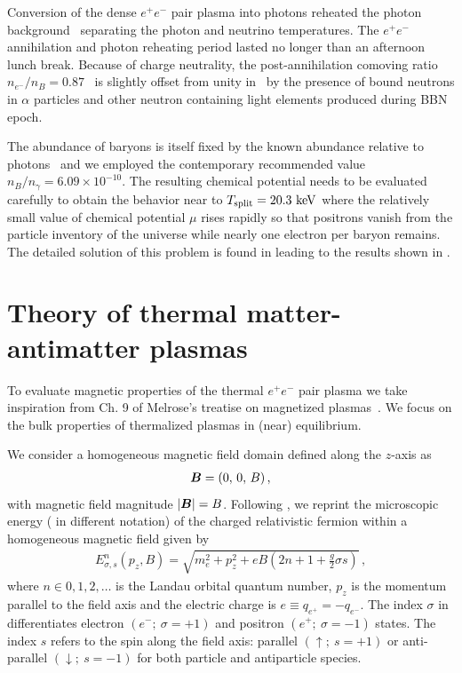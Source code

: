 Conversion of the dense $e^{+}e^{-}$ pair plasma into photons reheated the photon background~\citep{Birrell:2014uka} separating the photon and neutrino temperatures. The $e^{+}e^{-}$ annihilation and photon reheating period lasted no longer than an afternoon lunch break. Because of charge neutrality, the post-annihilation comoving ratio $n_{e^{-}}/n_{B}=0.87$~\citep{Rafelski:2023emw} is slightly offset from unity in~ by the presence of bound neutrons in $\alpha$ particles and other neutron containing light elements produced during BBN epoch.

The abundance of baryons is itself fixed by the known abundance relative to photons~\citep{ParticleDataGroup:2022pth} and we employed the contemporary recommended value $n_B/n_\gamma=6.09\times 10^{-10}$. The resulting chemical potential needs to be evaluated carefully to obtain the behavior near to $T_\mathrm{split}=20.3\text{ keV}$ where the relatively small value of chemical potential $\mu$ rises rapidly so that positrons vanish from the particle inventory of the universe while nearly one electron per baryon remains. The detailed solution of this problem is found in \cite{Fromerth:2012fe,Rafelski:2023emw} leading to the results shown in .

\section{Theory of thermal matter-antimatter plasmas}
\label{sec:theory}
\noindent To evaluate magnetic properties of the thermal $e^{+}e^{-}$ pair plasma we take inspiration from Ch. 9 of Melrose's treatise on magnetized plasmas~\citep{melrose2008quantum}. We focus on the bulk properties of thermalized plasmas in (near) equilibrium.

We consider a homogeneous magnetic field domain defined along the $z$-axis as
\begin{gather}
    \label{homoB:1}
    \boldsymbol{B}=(0,\,0,\,B)\,,
\end{gather}
with magnetic field magnitude $|\boldsymbol{B}|=B$. Following , we reprint the microscopic energy ( in different notation) of the charged relativistic fermion within a homogeneous magnetic field given by
\begin{align}
 \label{cosmokgp}
 E^{n}_{\sigma,s}(p_{z},{B})=\sqrt{m_{e}^{2}+p_{z}^{2}+e{B}\left(2n+1+\frac{g}{2}\sigma s\right)}\,,
\end{align}
where $n\in0,1,2,\ldots$ is the Landau orbital quantum number, $p_{z}$ is the momentum parallel to the field axis and the electric charge is $e\equiv q_{e^{+}}=-q_{e^{-}}$. The index $\sigma$ in  differentiates electron $(e^{-};\ \sigma=+1)$ and positron $(e^{+};\ \sigma=-1)$ states. The index $s$ refers to the spin along the field axis: parallel $(\uparrow;\ s=+1)$ or anti-parallel $(\downarrow;\ s=-1)$ for both particle and antiparticle species.


